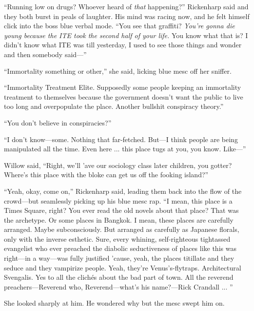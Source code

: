 ``Running low on drugs? Whoever heard of \textit{that} happening?'' Rickenharp said and they both burst in peals of laughter. His mind was racing now, and he felt himself click into the boss blue verbal mode. ``You see that graffiti? \textit{You're gonna die young because the ITE took the second half of your life.} You know what that is? I didn't know what ITE was till yesterday, I used to see those things and wonder and then somebody said---''

``Immortality something or other,'' she said, licking blue mesc off her sniffer.

``Immortality Treatment Elite. Supposedly some people keeping an immortality treatment to themselves because the government doesn't want the public to live too long and overpopulate the place. Another bullshit conspiracy theory.''

``You don't believe in conspiracies?''

``I don't know---some. Nothing that far-fetched. But---I think people are being manipulated all the time. Even here ... this place tugs at you, you know. Like---''

Willow said, ``Right, we'll 'ave our sociology class later children, you gotter? Where's this place with the bloke can get us off the fooking island?''

``Yeah, okay, come on,'' Rickenharp said, leading them back into the flow of the crowd---but seamlessly picking up his blue mesc rap. ``I mean, this place is a Times Square, right? You ever read the old novels about that place? That was the archetype. Or some places in Bangkok. I mean, these places are carefully arranged. Maybe subconsciously. But arranged as carefully as Japanese florals, only with the inverse esthetic. Sure, every whining, self-righteous tightassed evangelist who ever preached the diabolic seductiveness of places like this was right---in a way---was fully justified 'cause, yeah, the places titillate and they seduce and they vampirize people. Yeah, they're Venus's-flytraps. Architectural Svengalis. Yes to all the clichés about the bad part of town. All the reverend preachers---Reverend who, Reverend---what's his name?---Rick Crandall ... ''

She looked sharply at him. He wondered why but the mesc swept him on.


